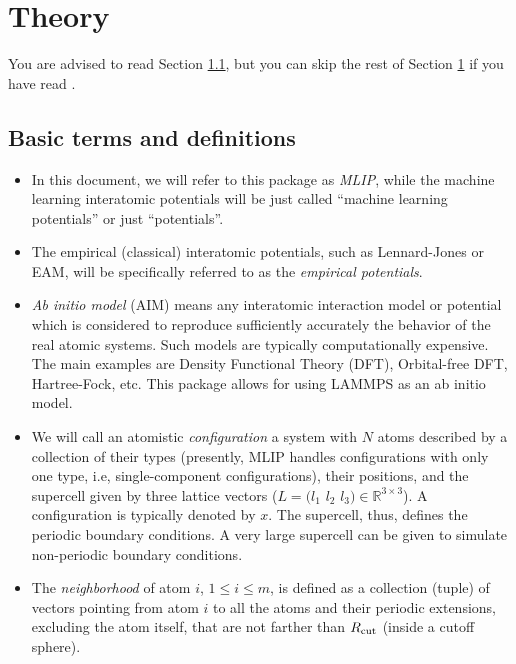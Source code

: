 \documentclass[12pt]{article}
\renewcommand{\_}{\char`_}
\begin{document}
\section{Theory}\label{sec:theory}

You are advised to read Section \ref{sec:theory:basic}, but you can skip the rest of Section \ref{sec:theory} if you have read \cite{Shapeev2016-MTP,ActiveLearning}.

\subsection{Basic terms and definitions}\label{sec:theory:basic}

\begin{itemize}
	\item In this document, we will refer to this package as \emph{MLIP}, while the machine learning interatomic potentials will be just called ``machine learning potentials'' or just ``potentials''. 
	
	\item The empirical (classical) interatomic potentials, such as Lennard-Jones or EAM, will be specifically referred to as the \emph{empirical potentials}.
	
	\item \emph{Ab initio model} (AIM) means any interatomic interaction model or potential which is considered to reproduce sufficiently accurately the behavior of the real atomic systems. Such models are typically computationally expensive. The main examples are Density Functional Theory (DFT), Orbital-free DFT, Hartree-Fock, etc.
	This package allows for using LAMMPS as an ab initio model.
	
	\item We will call an atomistic \emph{configuration} a system with $N$ atoms described by a collection of their types (presently, MLIP handles configurations with only one type, i.e, single-component configurations), their positions, and the supercell given by three lattice vectors ($L = \big(l_1 \,\, l_2 \,\, l_3\big)\in{\mathbb R}^{3\times 3}$).
	A configuration is typically denoted by $x$.
	The supercell, thus, defines the periodic boundary conditions.
	A very large supercell can be given to simulate non-periodic boundary conditions.
	
	\item The \emph{neighborhood} of atom $i$, $1\leq i\leq m$, is defined as a collection (tuple) of vectors pointing from atom $i$ to all the atoms and their periodic extensions, excluding the atom itself, that are not farther than $R_{\rm cut}$ (inside a cutoff sphere).
	

\end{itemize}
\end{document}
